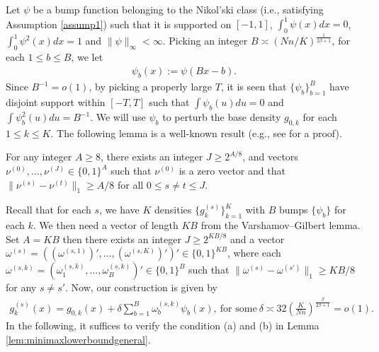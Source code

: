 \documentclass[preprint,11pt]{article}
\numberwithin{equation}{section}
\begin{document}
Let $\psi$ be a bump function belonging to the Nikol’ski class (i.e., satisfying Assumption \ref{assump1}) such that it is supported on $[-1,1]$, $\int_0^1 \psi(x)dx=0$, $\int_0^1 \psi^2(x)dx=1$ and $\|\psi\|_{\infty}<\infty$. Picking an integer $B\asymp (Nn/K)^{\frac{1}{2\beta+1}}$, for each $1\le b\le B$, we let 
\begin{align*}
    \psi_b(x):=\psi\left(Bx-b\right).
\end{align*}
Since $B^{-1}=o(1)$, by picking a properly large $T$, it is seen that $\{\psi_b\}_{b=1}^B$ have disjoint support within $[-T,T]$ such that $\int \psi_b(u)du=0$ and $\int \psi^2_b(u)du=B^{-1}$. We will use $\psi_b$ to perturb the base density $g_{0,k}$ for each $1\le k\le K$. The following lemma is a well-known result (e.g., see \cite[Lemma 2.9]{tsybakov2009introduction} for a proof).
\begin{lemma}
    For any integer $A\ge 8$, there exists an integer $J\ge 2^{A/8}$, and vectors $\nu^{(0)},\ldots,\nu^{(J)}\in \{0,1\}^A$ such that $\nu^{(0)}$ is a zero vector and that $\|\nu^{(s)}-\nu^{(t)}\|_1\ge A/8$ for all $0\le s\neq t\le J$.
\end{lemma}
Recall that for each $s$, we have $K$ densities $\{g_k^{(s)}\}_{k=1}^K$ with $B$ bumps $\{\psi_b\}$ for each $k$. We then need a vector of length $KB$ from the Varshamov–Gilbert lemma. Set $A=KB$ then there exists an integer $J\ge 2^{KB/8}$ and a vector $\omega^{(s)}=((\omega^{(s,1)})',\ldots,(\omega^{(s,K)})')'\in \{0,1\}^{KB}$, where each $\omega^{(s,k)}=(\omega_1^{(s,k)},\ldots,\omega_B^{(s,k)})'\in \{0,1\}^B$ such that $\|\omega^{(s)}-\omega^{(s')}\|_1\ge KB/8$ for any $s\neq s'$. Now, our construction is given by
\begin{align*}
    g_k^{(s)}(x)=g_{0,k}(x)+\delta\sum_{b=1}^B\omega_b^{(s,k)}\psi_b(x),\ \text{for some}\ \delta\asymp32\left(\frac{K}{Nn}\right)^{\frac{\beta}{2\beta+1}}=o(1).
\end{align*}
In the following, it suffices to verify the condition (a) and (b) in Lemma \ref{lem:minimaxlowerboundgeneral}.
\end{document}

